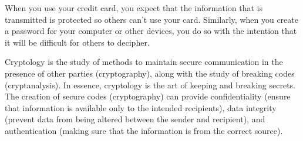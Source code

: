  \label{chap:bases_dimension}

\vspace*{-17 pt}

\vspace*{13 pt}

\label{sec:appl_latt_crypt}   

When you use your credit card, you expect that the information that is transmitted is protected so others can't use your card. Similarly, when you create a password for your computer or other devices, you do so with the intention that it will be difficult for others to decipher. 

Cryptology is the study of methods to maintain secure communication in the presence of other parties (cryptography), along with the study of breaking codes (cryptanalysis). In essence, cryptology is the art of keeping and breaking secrets. The creation of secure codes (cryptography) can provide confidentiality (ensure that information is available only to the intended recipients), data integrity (prevent data from being altered between the sender and recipient), and authentication (making sure that the information is from the correct source). 

